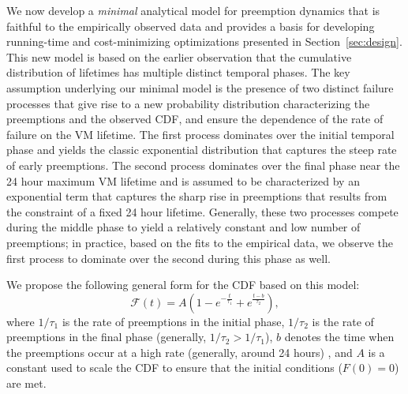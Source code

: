 We now develop a \emph{minimal} analytical model for preemption dynamics that is faithful to the empirically observed data and provides a basis for developing running-time and cost-minimizing optimizations presented in Section~\ref{sec:design}.
This new model is based on the earlier observation that the cumulative distribution of lifetimes has multiple distinct temporal phases. The key assumption underlying our minimal model is the presence of two distinct failure processes that give rise to a new probability distribution characterizing the preemptions and the observed CDF, and ensure the dependence of the rate of failure on the VM lifetime. The first process dominates over the initial temporal phase and yields the classic exponential distribution that captures the steep rate of early preemptions. The second process dominates over the final phase near the 24 hour maximum VM lifetime and is assumed to be characterized by an exponential term that captures the sharp rise in preemptions that results from the constraint of a fixed 24 hour lifetime. Generally, these two processes compete during the middle phase to yield a relatively constant and low number of preemptions; in practice, based on the fits to the empirical data, we observe the first process to dominate over the second during this phase as well. 

%
%

We propose the following general form for the CDF based on this model:
\begin{equation}
  \label{eq:blend1}
  \mathscr{F}\left(t\right) = A\left(1-e^{-\frac{t}{\tau_1}} + e^{\frac{t-b}{\tau_2}}\right),
\end{equation}
where $1/\tau_1$ is the rate of preemptions in the initial phase, $1/\tau_2$ is the rate of preemptions in the final phase (generally, $1/\tau_2 > 1/\tau_1$), $b$ denotes the time when the preemptions occur at a high rate (generally, around 24 hours) , and $A$ is a constant used to scale the CDF to ensure that the initial conditions ($F(0)=0$) are met.

